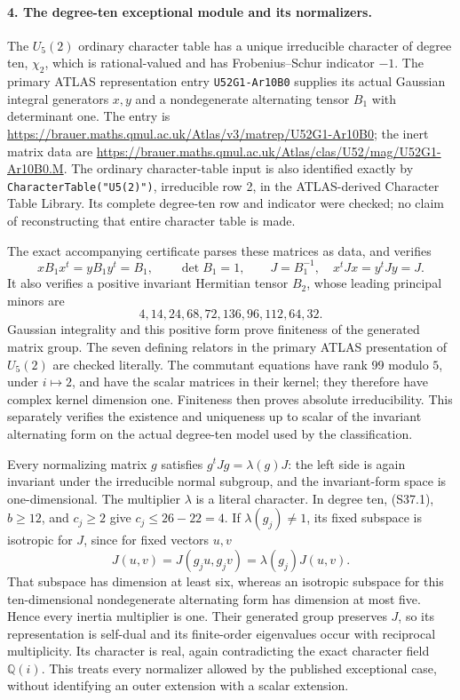 \paragraph{4. The degree-ten exceptional module and its normalizers.}
The \(U_5(2)\) ordinary character table has a unique irreducible
character of degree ten, \(\chi_2\), which is rational-valued
and has Frobenius--Schur indicator \(-1\).
The primary ATLAS representation entry
\texttt{U52G1-Ar10B0} supplies its actual Gaussian integral
generators \(x,y\) and a nondegenerate alternating tensor
\(B_1\) with determinant one. The entry is
\url{https://brauer.maths.qmul.ac.uk/Atlas/v3/matrep/U52G1-Ar10B0};
the inert matrix data are
\url{https://brauer.maths.qmul.ac.uk/Atlas/clas/U52/mag/U52G1-Ar10B0.M}.
The ordinary character-table input is also identified exactly by
\texttt{CharacterTable("U5(2)")}, irreducible row 2, in the
ATLAS-derived Character Table Library. Its complete degree-ten
row and indicator were checked; no claim of reconstructing that
entire character table is made.

The exact accompanying certificate parses these matrices as data,
and verifies
\[
 xB_1x^t=yB_1y^t=B_1,\qquad \det B_1=1,\qquad
 J=B_1^{-1},\quad x^tJx=y^tJy=J.                              \tag{S37.7}
\]
It also verifies a positive invariant Hermitian tensor \(B_2\),
whose leading principal minors are
\[
        4,14,24,68,72,136,96,112,64,32.
\]
Gaussian integrality and this positive form prove finiteness of
the generated matrix group. The seven defining relators in the
primary ATLAS presentation of \(U_5(2)\) are checked literally.
The commutant equations have rank 99 modulo \(5\), under
\(i\mapsto2\), and have the scalar matrices in their kernel;
they therefore have complex kernel dimension one. Finiteness
then proves absolute irreducibility. This separately verifies the
existence and uniqueness up to scalar of the invariant alternating
form on the actual degree-ten model used by the classification.

Every normalizing matrix \(g\) satisfies
\(g^tJg=\lambda(g)J\): the left side is again invariant
under the irreducible normal subgroup, and the invariant-form
space is one-dimensional. The multiplier \(\lambda\) is a
literal character. In degree ten, (S37.1), \(b\ge12\), and
\(c_j\ge2\) give \(c_j\le26-22=4\).
If \(\lambda(g_j)\ne1\), its fixed subspace is isotropic
for \(J\), since for fixed vectors \(u,v\)
\[
             J(u,v)=J(g_ju,g_jv)=\lambda(g_j)J(u,v).
\]
That subspace has dimension at least six, whereas an isotropic
subspace for this ten-dimensional nondegenerate alternating form
has dimension at most five. Hence every inertia multiplier is one.
Their generated group preserves \(J\), so its representation is
self-dual and its finite-order eigenvalues occur with reciprocal
multiplicity. Its character is real, again contradicting the
exact character field \(\mathbb Q(i)\).
This treats every normalizer allowed by the published exceptional
case, without identifying an outer extension with a scalar extension.

